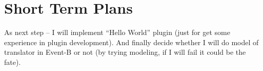 \section{Short Term Plans}

As next step -- I will implement ``Hello World'' plugin (just for get some
experience in plugin development). And finally decide whether I will do model of
translator in Event-B or not (by trying modeling, if I will fail it could be
the fate). 